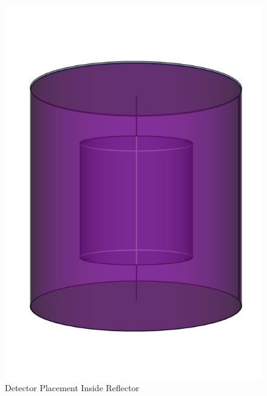\begin{figure}[H]
\centering
\includegraphics[width=0.6\linewidth]{figures/detector-layout.png}
\caption{Detector Placement Inside Reflector}
\label{fig:det-place}
\end{figure}